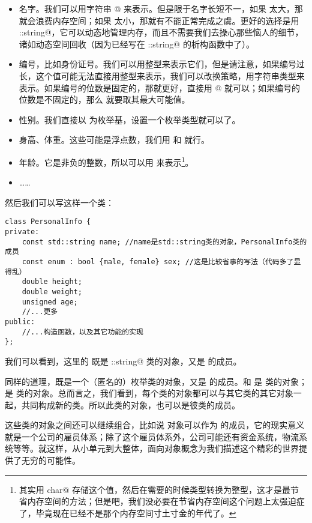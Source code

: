 \begin{itemize}
    \item 名字。我们可以用字符串 \lstinline@char[N]@ 来表示。但是限于名字长短不一，如果 \lstinline@N@ 太大，那就会浪费内存空间；如果 \lstinline@N@ 太小，那就有不能正常完成之虞。更好的选择是用 \lstinline@std::string@，它可以动态地管理内存，而且不需要我们去操心那些恼人的细节，诸如动态空间回收（因为已经写在 \lstinline@std::string@ 的析构函数中了）。
    \item 编号，比如身份证号。我们可以用整型来表示它们，但是请注意，如果编号过长，这个值可能无法直接用整型来表示，我们可以改换策略，用字符串类型来表示。如果编号的位数是固定的，那就更好，直接用 \lstinline@char[N]@ 就可以；如果编号的位数是不固定的，那么 \lstinline@N@ 就要取其最大可能值。
    \item 性别。我们直接以 \lstinline@bool@ 为枚举基，设置一个枚举类型就可以了。
    \item 身高、体重。这些可能是浮点数，我们用 \lstinline@float@ 和 \lstinline@double@ 就行。
    \item 年龄。它是非负的整数，所以可以用 \lstinline@unsigned@ 来表示\footnote{其实用 \lstinline@unsigned char@ 存储这个值，然后在需要的时候类型转换为整型，这才是最节省内存空间的方法；但是吧，我们没必要在节省内存空间这个问题上太强迫症了，毕竟现在已经不是那个内存空间寸土寸金的年代了。}。
    \item ……
\end{itemize}\par
然后我们可以写这样一个类：
\begin{lstlisting}
class PersonalInfo {
private:
    const std::string name; //name是std::string类的对象，PersonalInfo类的成员
    const enum : bool {male, female} sex; //这是比较省事的写法（代码多了显得乱）
    double height;
    double weight;
    unsigned age;
    //...更多
public:
    //...构造函数，以及其它功能的实现
};
\end{lstlisting}\par
我们可以看到，这里的 \lstinline@name@ 既是 \lstinline@std::string@ 类的对象，又是 \lstinline@PersonalInfo@ 的成员。\par
同样的道理，\lstinline@sex@ 既是一个（匿名的）枚举类的对象，又是 \lstinline@PersonalInfo@ 的成员。\lstinline@height@ 和 \lstinline@weight@ 是 \lstinline@double@ 类的对象；\lstinline@age@ 是 \lstinline@unsigned@ 类的对象。总而言之，我们看到，每个类的对象都可以与其它类的其它对象一起，共同构成新的类。所以此类的对象，也可以是彼类的成员。\par
这些类的对象之间还可以继续组合，比如说 \lstinline@PersonalInfo@ 对象可以作为 \lstinline@Company@ 的成员，它的现实意义就是一个公司的雇员体系；除了这个雇员体系外，公司可能还有资金系统，物流系统等等。就这样，从小单元到大整体，面向对象概念为我们描述这个精彩的世界提供了无穷的可能性。\par
